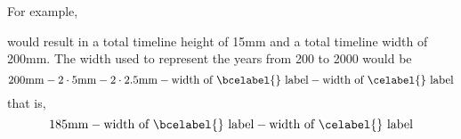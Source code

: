 \documentclass[10pt,british,a4paper]{ltxdoc}
\begin{document}
For example,
\begin{chronoscode}
  \begin{chronos}
    [
      timeline={%
        timeline height=10mm,
        timeline border height=2.5mm,
        timeline width=200mm,
        timeline mark eras,
        timeline margin=5mm,
        timeline era margin=2.5mm,
        dates={-200}:2000,
      },
    ]
  \end{chronos}
\end{chronoscode}
would result in a total timeline height of 15mm and a total timeline width of 200mm.
The width used to represent the years from 200 \bceyearlabel{} to 2000 \ceyearlabel{} would be
\[
  200\mathrm{mm} - 2\cdot5\mathrm{mm} - 2\cdot2.5\mathrm{mm} - \text{width of \bcelabel{} label} - \text{width of \celabel{} label} 
\]
that is,
\[
  185\mathrm{mm} - \text{width of \bcelabel{} label} - \text{width of \celabel{} label} 
\]
\end{document}
